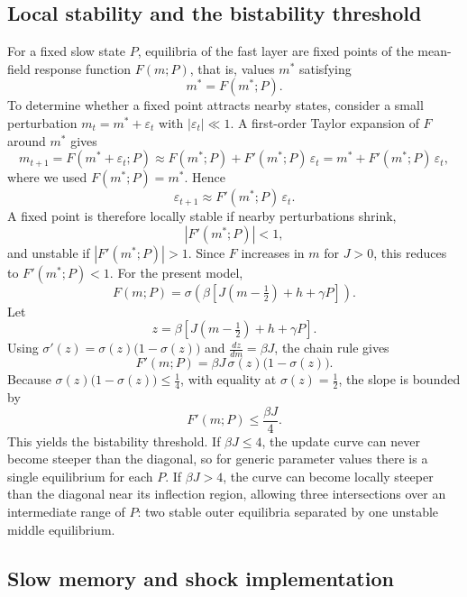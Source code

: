 \documentclass[man,12pt,floatsintext]{apa7}
\begin{document}
\subsection{Local stability and the bistability threshold}
For a fixed slow state \(P\), equilibria of the fast layer are fixed points of the mean-field response function \(F(m;P)\), that is, values \(m^\ast\) satisfying
\[
m^\ast = F(m^\ast;P).
\]
To determine whether a fixed point attracts nearby states, consider a small perturbation \(m_t=m^\ast+\varepsilon_t\) with \(|\varepsilon_t|\ll 1\). A first-order Taylor expansion of \(F\) around \(m^\ast\) gives
\[
m_{t+1}=F(m^\ast+\varepsilon_t;P)\approx F(m^\ast;P)+F'(m^\ast;P)\,\varepsilon_t
= m^\ast + F'(m^\ast;P)\,\varepsilon_t,
\]
where we used \(F(m^\ast;P)=m^\ast\). Hence
\[
\varepsilon_{t+1}\approx F'(m^\ast;P)\,\varepsilon_t.
\]
A fixed point is therefore locally stable if nearby perturbations shrink,
\begin{equation}\label{eq:stability}
|F'(m^\ast;P)|<1,
\end{equation}
and unstable if \(|F'(m^\ast;P)|>1\). Since \(F\) increases in \(m\) for \(J>0\), this reduces to \(F'(m^\ast;P)<1\).
For the present model,
\[
F(m;P)=\sigma\!\left(\beta\left[J\left(m-\tfrac12\right)+h+\gamma P\right]\right).
\]
Let
\[
z=\beta\left[J\left(m-\tfrac12\right)+h+\gamma P\right].
\]
Using \(\sigma'(z)=\sigma(z)\bigl(1-\sigma(z)\bigr)\) and \(\frac{dz}{dm}=\beta J\), the chain rule gives
\begin{equation}\label{eq:Fprime}
F'(m;P)=\beta J\,\sigma(z)\bigl(1-\sigma(z)\bigr).
\end{equation}
Because \(\sigma(z)\bigl(1-\sigma(z)\bigr)\le \tfrac14\), with equality at \(\sigma(z)=\tfrac12\), the slope is bounded by
\[
F'(m;P)\le \frac{\beta J}{4}.
\]
This yields the bistability threshold. If \(\beta J\le 4\), the update curve can never become steeper than the diagonal, so for generic parameter values there is a single equilibrium for each \(P\). If \(\beta J>4\), the curve can become locally steeper than the diagonal near its inflection region, allowing three intersections over an intermediate range of \(P\): two stable outer equilibria separated by one unstable middle equilibrium.
\subsection{Slow memory and shock implementation}
\end{document}
